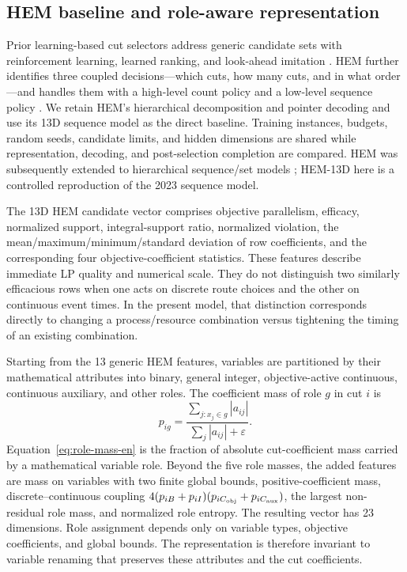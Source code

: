 \documentclass[journal]{IEEEtran}
\begin{document}
\subsection{HEM baseline and role-aware representation}

Prior learning-based cut selectors address generic candidate sets with reinforcement learning, learned ranking, and look-ahead imitation \cite{tang2020cut,huang2022cutranking,paulus2022looking}. HEM further identifies three coupled decisions---which cuts, how many cuts, and in what order---and handles them with a high-level count policy and a low-level sequence policy \cite{wang2023hem}. We retain HEM's hierarchical decomposition and pointer decoding and use its 13D sequence model as the direct baseline. Training instances, budgets, random seeds, candidate limits, and hidden dimensions are shared while representation, decoding, and post-selection completion are compared. HEM was subsequently extended to hierarchical sequence/set models \cite{wang2024hemset}; HEM-13D here is a controlled reproduction of the 2023 sequence model.

The 13D HEM candidate vector comprises objective parallelism, efficacy, normalized support, integral-support ratio, normalized violation, the mean/maximum/minimum/standard deviation of row coefficients, and the corresponding four objective-coefficient statistics. These features describe immediate LP quality and numerical scale. They do not distinguish two similarly efficacious rows when one acts on discrete route choices and the other on continuous event times. In the present model, that distinction corresponds directly to changing a process/resource combination versus tightening the timing of an existing combination.

Starting from the 13 generic HEM features, variables are partitioned by their mathematical attributes into binary, general integer, objective-active continuous, continuous auxiliary, and other roles. The coefficient mass of role $g$ in cut $i$ is
\begin{equation}
p_{ig}=\frac{\sum_{j:x_j\in g}|a_{ij}|}{\sum_j|a_{ij}|+\varepsilon}.
\label{eq:role-mass-en}
\end{equation}
Equation~\eqref{eq:role-mass-en} is the fraction of absolute cut-coefficient mass carried by a mathematical variable role. Beyond the five role masses, the added features are mass on variables with two finite global bounds, positive-coefficient mass, discrete--continuous coupling $4(p_{iB}+p_{iI})(p_{iC_{\rm obj}}+p_{iC_{\rm aux}})$, the largest non-residual role mass, and normalized role entropy. The resulting vector has 23 dimensions. Role assignment depends only on variable types, objective coefficients, and global bounds. The representation is therefore invariant to variable renaming that preserves these attributes and the cut coefficients.
\end{document}
